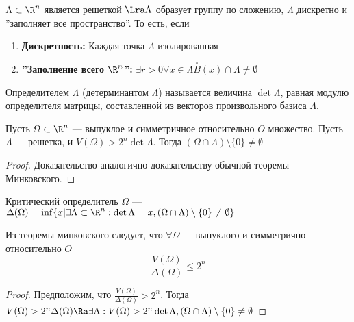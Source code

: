\begin{theorem}
    \(\Lambda \subset \R^n\) является решеткой \(\Lra \Lambda\) образует группу по сложению, \(\Lambda\) дискретно и ''заполняет все пространство''. То есть, если 
    \begin{enumerate}
        \item \textbf{Дискретность:} Каждая точка \(\Lambda\) изолированная
        \item \textbf{''Заполнение всего \(\R^n\)'':}  \(\exists r > 0 \forall x \in \Lambda \stackrel{\circ}{B}(x) \cap \Lambda \ne \emptyset\)
    \end{enumerate}
\end{theorem}

\begin{definition}
    Определителем \(\Lambda\) (детерминантом \(\Lambda\)) называется величина \(\det \Lambda\), равная модулю определителя матрицы, составленной из векторов произвольного базиса \(\Lambda\).
\end{definition}

\begin{theorem}[Минковского]
    Пусть \(\Omega \subset \R^n\) --- выпуклое и симметричное относительно \(O\) множество. Пусть \(\Lambda\) --- решетка, и \(V(\Omega) > 2^n\det \Lambda\). Тогда \((\Omega \cap \Lambda) \setminus \{0\} \ne \emptyset\)
\end{theorem}
\begin{proof}
    Доказательство аналогично доказательству обычной теоремы Минковского.
\end{proof}

\begin{definition}
    Критический определитель \(\Omega\) --- \(\Delta(\Omega) = \inf\{x | \exists \Lambda \subset \R^n: \det \Lambda = x, (\Omega \cap \Lambda) \setminus \{0\} \ne \emptyset\}\)
\end{definition}

\begin{proposition}
    Из теоремы минковского следует, что \(\forall\Omega\) --- выпуклого и симметрично относительно \(O\)
    \[\frac{V(\Omega)}{\Delta(\Omega)}\le 2^n\]
\end{proposition}
\begin{proof}
    Предположим, что \(\frac{V(\Omega)}{\Delta(\Omega)} > 2^n\). Тогда \(V(\Omega) > 2^n \Delta(\Omega) \Ra \exists \Lambda: V(\Omega) > 2^n \det \Lambda, (\Omega \cap \Lambda) \setminus \{0\} \ne \emptyset\)
\end{proof}

